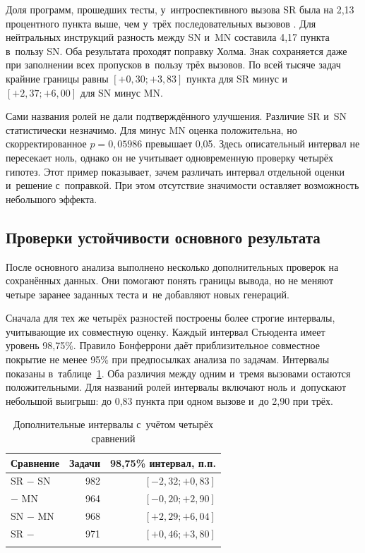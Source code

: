 Доля программ, прошедших тесты, у~интроспективного вызова SR была на 2,13 процентного пункта выше, чем у~трёх последовательных вызовов \MultiCallRole{}. Для нейтральных инструкций разность между SN и~MN составила 4,17 пункта в~пользу SN. Оба результата проходят поправку Холма. Знак сохраняется даже при заполнении всех пропусков в~пользу трёх вызовов. По всей тысяче задач крайние границы равны $[+0{,}30;+3{,}83]$ пункта для SR минус \MultiCallRole{} и~$[+2{,}37;+6{,}00]$ для SN минус MN.

Сами названия ролей не дали подтверждённого улучшения. Различие SR и~SN статистически незначимо. Для \MultiCallRole{} минус MN оценка положительна, но скорректированное $p=0{,}05986$ превышает 0,05. Здесь описательный интервал не пересекает ноль, однако он не учитывает одновременную проверку четырёх гипотез. Этот пример показывает, зачем различать интервал отдельной оценки и~решение с~поправкой. При этом отсутствие значимости оставляет возможность небольшого эффекта.

\subsection{Проверки устойчивости основного результата}
После основного анализа выполнено несколько дополнительных проверок на сохранённых данных. Они помогают понять границы вывода, но не меняют четыре заранее заданных теста и~не добавляют новых генераций.

Сначала для тех же четырёх разностей построены более строгие интервалы, учитывающие их совместную оценку. Каждый интервал Стьюдента имеет уровень 98,75\%. Правило Бонферрони даёт приблизительное совместное покрытие не менее 95\% при предпосылках анализа по задачам. Интервалы показаны в~таблице~\ref{tab:precision}. Оба различия между одним и~тремя вызовами остаются положительными. Для названий ролей интервалы включают ноль и~допускают небольшой выигрыш: до 0,83 пункта при одном вызове и~до 2,90 при трёх.

\begin{table}[htbp]
\caption{Дополнительные интервалы с~учётом четырёх сравнений}
\label{tab:precision}
\centering\small
\begin{tabular}{@{}lrr@{}}
\toprule
Сравнение & Задачи & 98,75\% интервал, п.п. \\
\midrule
SR $-$ SN & 982 & $[-2{,}32;+0{,}83]$ \\
\MultiCallRole{} $-$ MN & 964 & $[-0{,}20;+2{,}90]$ \\
SN $-$ MN & 968 & $[+2{,}29;+6{,}04]$ \\
SR $-$ \MultiCallRole{} & 971 & $[+0{,}46;+3{,}80]$ \\
\botrule
\end{tabular}
\end{table}
\FloatBarrier

